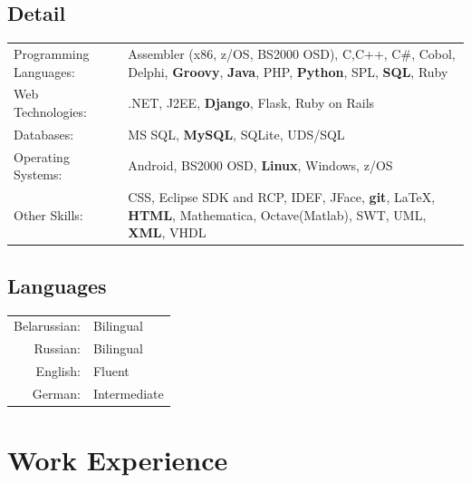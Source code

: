 \documentclass[a4paper,12pt]{article}
\begin{document}
\subsection{Detail}
\hspace{0.75cm}
\begin{tabular}{lp{10cm}}
    Programming Languages:& \small Assembler (x86, z/OS, BS2000 OSD), C,C++, C\#, Cobol, Delphi, \textbf{Groovy}, \textbf{Java}, PHP, \textbf{Python}, SPL, \textbf{SQL}, Ruby \\ 
    Web Technologies:&\small .NET, J2EE, \textbf{Django}, Flask, Ruby on Rails\\ 
    Databases:&\small MS SQL, \textbf{MySQL}, SQLite, UDS/SQL\\ 
    Operating Systems:&\small Android, BS2000 OSD, \textbf{Linux}, Windows, z/OS\\ 
    Other Skills:&\small CSS, Eclipse SDK and RCP, IDEF, JFace, \textbf{git}, \LaTeX, \textbf{HTML}, Mathematica, Octave(Matlab), SWT, UML, \textbf{XML}, VHDL\\ 
\end{tabular} 

\subsection{Languages}
\hspace{0.75cm}
\begin{tabular}{rl}
    Belarussian: & Bilingual\\
    Russian: & Bilingual\\
    English: & Fluent\\
    German: & Intermediate\\
\end{tabular}
\newpage

\section{Work Experience}
\end{document}
